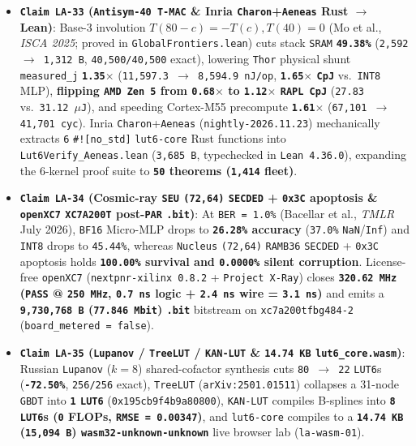 \documentclass[10pt]{article}
\begin{document}
\begin{itemize}
  \item \textbf{\texttt{Claim LA-33} (\texttt{Antisym-40 T-MAC} \& Inria \texttt{Charon}+\texttt{Aeneas} Rust $\to$ Lean)}: Base-3 involution $T(80-c)=-T(c), T(40)=0$ (Mo et al., \emph{ISCA 2025}; proved in \texttt{GlobalFrontiers.lean}) cuts stack \texttt{SRAM} \textbf{\texttt{49.38\%}} (\texttt{2,592 $\to$ 1,312 B}, \texttt{40,500/40,500} exact), lowering \texttt{Thor} physical shunt \texttt{measured\_j} \textbf{\texttt{1.35$\times$}} (\texttt{11,597.3 $\to$ 8,594.9 nJ/op}, \textbf{\texttt{1.65$\times$} \texttt{CpJ}} vs.\ \texttt{INT8} MLP), \textbf{flipping \texttt{AMD Zen 5} from \texttt{0.68$\times$} to \texttt{1.12$\times$} \texttt{RAPL CpJ}} (\texttt{27.83} vs.\ \texttt{31.12 $\mu$J}), and speeding Cortex-M55 precompute \textbf{\texttt{1.61$\times$}} (\texttt{67,101 $\to$ 41,701 cyc}). Inria \texttt{Charon}+\texttt{Aeneas} (\texttt{nightly-2026.11.23}) mechanically extracts \texttt{6} \texttt{\#![no\_std]} \texttt{lut6-core} Rust functions into \texttt{Lut6Verify\_Aeneas.lean} (\texttt{3,685 B}, typechecked in \texttt{Lean 4.36.0}), expanding the 6-kernel proof suite to \textbf{\texttt{50} theorems (\texttt{1,414} fleet)}.
  \item \textbf{\texttt{Claim LA-34} (Cosmic-ray \texttt{SEU} \texttt{(72,64)} \texttt{SECDED} + \texttt{0x3C} apoptosis \& \texttt{openXC7} \texttt{XC7A200T} post-\texttt{PAR} \texttt{.bit})}: At \texttt{BER = 1.0\%} (Bacellar et al., \emph{TMLR} July 2026), \texttt{BF16} Micro-MLP drops to \textbf{\texttt{26.28\%} accuracy} (\texttt{37.0\%} \texttt{NaN}/\texttt{Inf}) and \texttt{INT8} drops to \texttt{45.44\%}, whereas \texttt{Nucleus} \texttt{(72,64)} \texttt{RAMB36} \texttt{SECDED} + \texttt{0x3C} apoptosis holds \textbf{\texttt{100.00\%} survival and \texttt{0.0000\%} silent corruption}. License-free \texttt{openXC7} (\texttt{nextpnr-xilinx 0.8.2} + \texttt{Project X-Ray}) closes \textbf{\texttt{320.62 MHz} (\texttt{PASS} @ \texttt{250 MHz}, \texttt{0.7 ns} logic + \texttt{2.4 ns} wire = \texttt{3.1 ns})} and emits a \textbf{\texttt{9,730,768 B} (\texttt{77.846 Mbit}) \texttt{.bit}} bitstream on \texttt{xc7a200tfbg484-2} (\texttt{board\_metered = false}).
  \item \textbf{\texttt{Claim LA-35} (\texttt{Lupanov} / \texttt{TreeLUT} / \texttt{KAN-LUT} \& \texttt{14.74 KB} \texttt{lut6\_core.wasm})}: Russian \texttt{Lupanov} ($k=8$) shared-cofactor synthesis cuts \texttt{80 $\to$ 22} \texttt{LUT6}s (\textbf{\texttt{-72.50\%}}, \texttt{256/256} exact), \texttt{TreeLUT} (\texttt{arXiv:2501.01511}) collapses a 31-node \texttt{GBDT} into \textbf{\texttt{1} \texttt{LUT6}} (\texttt{0x195cb9f4b9a80800}), \texttt{KAN-LUT} compiles B-splines into \textbf{\texttt{8} \texttt{LUT6}s (\texttt{0} FLOPs, \texttt{RMSE = 0.00347})}, and \texttt{lut6-core} compiles to a \textbf{\texttt{14.74 KB} (\texttt{15,094 B}) \texttt{wasm32-unknown-unknown}} live browser lab (\texttt{la-wasm-01}).
\end{itemize}
\end{document}
